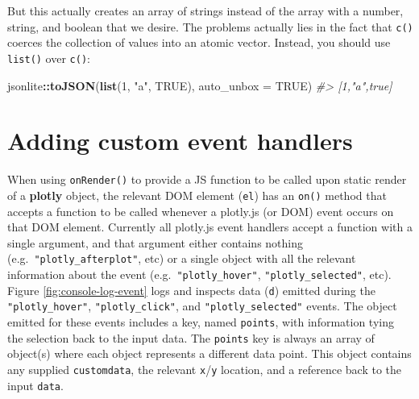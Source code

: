 \documentclass[
  12pt,
]{krantz}
\newenvironment{Shaded}{\begin{snugshade}}{\end{snugshade}}
\newcommand{\CommentTok}[1]{\textcolor[rgb]{0.56,0.35,0.01}{\textit{#1}}}
\newcommand{\DataTypeTok}[1]{\textcolor[rgb]{0.13,0.29,0.53}{#1}}
\newcommand{\DecValTok}[1]{\textcolor[rgb]{0.00,0.00,0.81}{#1}}
\newcommand{\KeywordTok}[1]{\textcolor[rgb]{0.13,0.29,0.53}{\textbf{#1}}}
\newcommand{\NormalTok}[1]{#1}
\newcommand{\OperatorTok}[1]{\textcolor[rgb]{0.81,0.36,0.00}{\textbf{#1}}}
\newcommand{\OtherTok}[1]{\textcolor[rgb]{0.56,0.35,0.01}{#1}}
\newcommand{\StringTok}[1]{\textcolor[rgb]{0.31,0.60,0.02}{#1}}
\begin{document}
But this actually creates an array of strings instead of the array with a number, string, and boolean that we desire. The problems actually lies in the fact that \texttt{c()} coerces the collection of values into an atomic vector. Instead, you should use \texttt{list()} over \texttt{c()}:

\begin{Shaded}
\begin{Highlighting}[]
\NormalTok{jsonlite}\OperatorTok{::}\KeywordTok{toJSON}\NormalTok{(}\KeywordTok{list}\NormalTok{(}\DecValTok{1}\NormalTok{, }\StringTok{"a"}\NormalTok{, }\OtherTok{TRUE}\NormalTok{), }\DataTypeTok{auto_unbox =} \OtherTok{TRUE}\NormalTok{)}
\CommentTok{#> [1,"a",true]}
\end{Highlighting}
\end{Shaded}

\hypertarget{js-event-handlers}{%
\chapter{Adding custom event handlers}\label{js-event-handlers}}

When using \texttt{onRender()} to provide a JS function to be called upon static render of a \textbf{plotly} object, the relevant DOM element (\texttt{el}) has an \texttt{on()} method that accepts a function to be called whenever a plotly.js (or DOM) event occurs on that DOM element. Currently all plotly.js event handlers accept a function with a single argument, and that argument either contains nothing (e.g.~\texttt{"plotly\_afterplot"}, etc) or a single object with all the relevant information about the event (e.g.~\texttt{"plotly\_hover"}, \texttt{"plotly\_selected"}, etc). Figure \ref{fig:console-log-event} logs and inspects data (\texttt{d}) emitted during the \texttt{"plotly\_hover"}, \texttt{"plotly\_click"}, and \texttt{"plotly\_selected"} events. The object emitted for these events includes a key, named \texttt{points}, with information tying the selection back to the input data. The \texttt{points} key is always an array of object(s) where each object represents a different data point. This object contains any supplied \texttt{customdata}, the relevant \texttt{x}/\texttt{y} location, and a reference back to the input \texttt{data}.

\begin{Shaded}
\end{Shaded}
\end{document}
